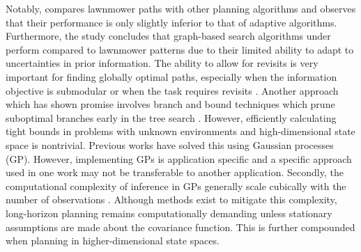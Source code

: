 

Notably, \cite{frolov2014} compares lawnmower paths with other planning algorithms and observes that their performance is only slightly inferior to that of adaptive algorithms. Furthermore, the study concludes that graph-based search algorithms under perform compared to lawnmower patterns due to their limited ability to adapt to uncertainties in prior information. The ability to allow for revisits is very important for finding globally optimal paths, especially when the information objective is submodular or when the task requires revisits \cite{moon2022tigris}. Another approach which has shown promise involves branch and bound techniques which prune suboptimal branches early in the tree search \cite{6224902, bnb-2}. However, efficiently calculating tight bounds in problems with unknown environments and high-dimensional state space is nontrivial. Previous works have solved this using Gaussian processes (GP). However, implementing GPs is application specific and a specific approach used in one work may not be transferable to another application. 
Secondly, the computational complexity of inference in GPs generally scale cubically with the number of observations \cite{rasmussen2006gaussian}. Although methods exist to mitigate this complexity, long-horizon planning remains computationally demanding unless stationary assumptions are made about the covariance function. This is further compounded when planning in higher-dimensional state spaces. 

